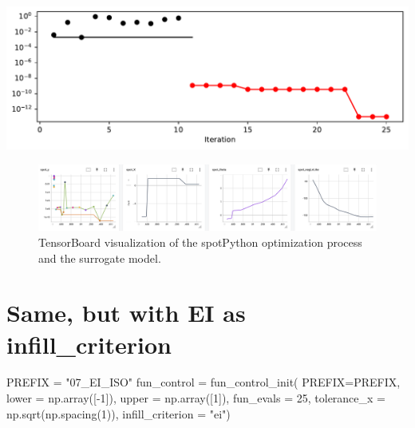 \documentclass[
  letterpaper,
  DIV=11,
  numbers=noendperiod]{scrreprt}
\newenvironment{Shaded}{\begin{snugshade}}{\end{snugshade}}
\newcommand{\DecValTok}[1]{\textcolor[rgb]{0.68,0.00,0.00}{#1}}
\newcommand{\NormalTok}[1]{\textcolor[rgb]{0.00,0.23,0.31}{#1}}
\newcommand{\OperatorTok}[1]{\textcolor[rgb]{0.37,0.37,0.37}{#1}}
\newcommand{\StringTok}[1]{\textcolor[rgb]{0.13,0.47,0.30}{#1}}
\begin{document}
\includegraphics{012_num_spot_ei_files/figure-pdf/cell-7-output-1.pdf}

\begin{figure}[H]

{\centering \includegraphics[width=1\textwidth,height=\textheight]{figures_static/07_tensorboard_Y.png}

}

\caption{TensorBoard visualization of the spotPython optimization
process and the surrogate model.}

\end{figure}%

\section{Same, but with EI as
infill\_criterion}\label{same-but-with-ei-as-infill_criterion}

\begin{Shaded}
\begin{Highlighting}[]
\NormalTok{PREFIX }\OperatorTok{=} \StringTok{"07\_EI\_ISO"}
\NormalTok{fun\_control }\OperatorTok{=}\NormalTok{ fun\_control\_init(}
\NormalTok{    PREFIX}\OperatorTok{=}\NormalTok{PREFIX,}
\NormalTok{    lower }\OperatorTok{=}\NormalTok{ np.array([}\OperatorTok{{-}}\DecValTok{1}\NormalTok{]),}
\NormalTok{    upper }\OperatorTok{=}\NormalTok{ np.array([}\DecValTok{1}\NormalTok{]),}
\NormalTok{    fun\_evals }\OperatorTok{=} \DecValTok{25}\NormalTok{,}
\NormalTok{    tolerance\_x }\OperatorTok{=}\NormalTok{ np.sqrt(np.spacing(}\DecValTok{1}\NormalTok{)),}
\NormalTok{    infill\_criterion }\OperatorTok{=} \StringTok{"ei"}\NormalTok{)}
\end{Highlighting}
\end{Shaded}
\end{document}
